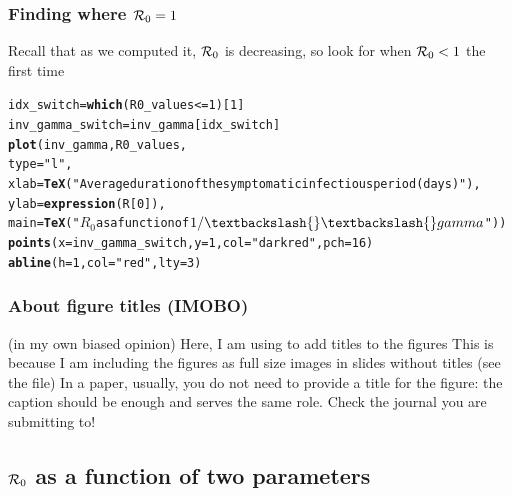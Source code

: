 \documentclass[aspectratio=169]{beamer}\usepackage[]{graphicx}\usepackage[]{xcolor}
\makeatletter
\newcommand{\hlnum}[1]{\textcolor[rgb]{0.686,0.059,0.569}{#1}}%
\newcommand{\hlsng}[1]{\textcolor[rgb]{0.192,0.494,0.8}{#1}}%
\newcommand{\hlopt}[1]{\textcolor[rgb]{0,0,0}{#1}}%
\newcommand{\hldef}[1]{\textcolor[rgb]{0.345,0.345,0.345}{#1}}%
\newcommand{\hlkwb}[1]{\textcolor[rgb]{0.69,0.353,0.396}{#1}}%
\newcommand{\hlkwc}[1]{\textcolor[rgb]{0.333,0.667,0.333}{#1}}%
\newcommand{\hlkwd}[1]{\textcolor[rgb]{0.737,0.353,0.396}{\textbf{#1}}}%
\newenvironment{kframe}{%
 \def\at@end@of@kframe{}%
 \ifinner\ifhmode%
  \def\at@end@of@kframe{\end{minipage}}%
  \begin{minipage}{\columnwidth}%
 \fi\fi%
 \def\FrameCommand##1{\hskip\@totalleftmargin \hskip-\fboxsep
 \colorbox{shadecolor}{##1}\hskip-\fboxsep
     \hskip-\linewidth \hskip-\@totalleftmargin \hskip\columnwidth}%
 \MakeFramed {\advance\hsize-\width
   \@totalleftmargin\z@ \linewidth\hsize
   \@setminipage}}%
 {\par\unskip\endMakeFramed%
 \at@end@of@kframe}
\newenvironment{knitrout}{}{} %
\makeatother
\begin{document}
\begin{frame}[fragile]\frametitle{Finding where $\mathcal{R}_0=1$}
Recall that as we computed it, $\mathcal{R}_0$ is decreasing, so look for when $\mathcal{R}_0<1$ the first time
\vfill
\begin{knitrout}
\color{fgcolor}\begin{kframe}
\begin{alltt}
\hldef{idx_switch} \hlkwb{=} \hlkwd{which}\hldef{(R0_values}\hlopt{<=}\hlnum{1}\hldef{)[}\hlnum{1}\hldef{]}
\hldef{inv_gamma_switch} \hlkwb{=} \hldef{inv_gamma[idx_switch]}
\hlkwd{plot}\hldef{(inv_gamma, R0_values,}
     \hlkwc{type}\hldef{=}\hlsng{"l"}\hldef{,}
     \hlkwc{xlab}\hldef{=}\hlkwd{TeX}\hldef{(}\hlsng{"Average duration of the symptomatic infectious period (days)"}\hldef{),}
     \hlkwc{ylab}\hldef{=}\hlkwd{expression}\hldef{(R[}\hlnum{0}\hldef{]),}
     \hlkwc{main} \hldef{=} \hlkwd{TeX}\hldef{(}\hlsng{"$R_0$ as a function of $1/\textbackslash{}\textbackslash{}gamma$"}\hldef{))}
\hlkwd{points}\hldef{(}\hlkwc{x} \hldef{= inv_gamma_switch,} \hlkwc{y} \hldef{=} \hlnum{1}\hldef{,} \hlkwc{col} \hldef{=} \hlsng{"darkred"}\hldef{,} \hlkwc{pch} \hldef{=} \hlnum{16}\hldef{)}
\hlkwd{abline}\hldef{(}\hlkwc{h}\hldef{=}\hlnum{1}\hldef{,} \hlkwc{col}\hldef{=}\hlsng{"red"}\hldef{,} \hlkwc{lty} \hldef{=} \hlnum{3}\hldef{)}
\end{alltt}
\end{kframe}
\end{knitrout}
\end{frame}


\begin{frame}\frametitle{About figure titles (IMOBO)}
(in my own biased opinion)
\vfill
Here, I am using  to add titles to the figures
\vfill
This is because I am including the figures as full size images in slides without titles (see the  file)
\vfill
In a paper, usually, you do not need to provide a title for the figure: the caption should be enough and serves the same role. Check the journal you are submitting to!
\end{frame}

\subsection{$\mathcal{R}_0$ as a function of two parameters}
\end{document}
